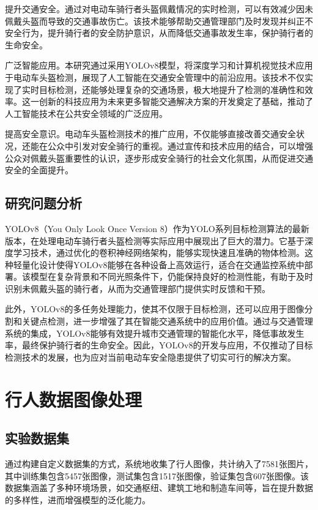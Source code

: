 \documentclass[journal]{IEEEtran}
\numberwithin{figure}{section}%
\numberwithin{table}{section}%
\numberwithin{equation}{section}
\begin{document}
提升交通安全。通过对电动车骑行者头盔佩戴情况的实时检测，可以有效减少因未佩戴头盔而导致的交通事故伤亡。该技术能够帮助交通管理部门及时发现并纠正不安全行为，提升骑行者的安全防护意识，从而降低交通事故发生率，保护骑行者的生命安全。\par
广泛智能应用。本研究通过采用YOLOv8模型，将深度学习和计算机视觉技术应用于电动车头盔检测，展现了人工智能在交通安全管理中的前沿应用。该技术不仅实现了实时目标检测，还能够处理复杂的交通场景，极大地提升了检测的准确性和效率。这一创新的科技应用为未来更多智能交通解决方案的开发奠定了基础，推动了人工智能技术在公共安全领域的广泛应用。\par
提高安全意识。电动车头盔检测技术的推广应用，不仅能够直接改善交通安全状况，还能在公众中引发对安全骑行的重视。通过宣传和技术应用的结合，可以增强公众对佩戴头盔重要性的认识，逐步形成安全骑行的社会文化氛围，从而促进交通安全的全面提升。\par

\subsection{研究问题分析}
YOLOv8（You Only Look Once Version 8）作为YOLO系列目标检测算法的最新版本，在处理电动车骑行者头盔检测等实际应用中展现出了巨大的潜力。它基于深度学习技术，通过优化的卷积神经网络架构，能够实现快速且准确的物体检测。这种轻量化设计使得YOLOv8能够在各种设备上高效运行，适合在交通监控系统中部署。该模型在复杂背景和不同光照条件下，仍能保持良好的检测性能，有助于及时识别未佩戴头盔的骑行者，从而为交通管理部门提供实时反馈和干预。\par
此外，YOLOv8的多任务处理能力，使其不仅限于目标检测，还可以应用于图像分割和关键点检测，进一步增强了其在智能交通系统中的应用价值。通过与交通管理系统的集成，YOLOv8能够有效提升城市交通管理的智能化水平，降低事故发生率，最终保护骑行者的生命安全。因此，YOLOv8的开发与应用，不仅推动了目标检测技术的发展，也为应对当前电动车安全隐患提供了切实可行的解决方案。

\setcounter{equation}{0}
\section{行人数据图像处理}
\subsection{实验数据集}
通过构建自定义数据集的方式，系统地收集了行人图像，共计纳入了7581张图片，其中训练集包含5457张图像，测试集包含1517张图像，验证集包含607张图像。该数据集涵盖了多种环境场景，如交通枢纽、建筑工地和制造车间等，旨在提升数据的多样性，进而增强模型的泛化能力。\par
\end{document}
